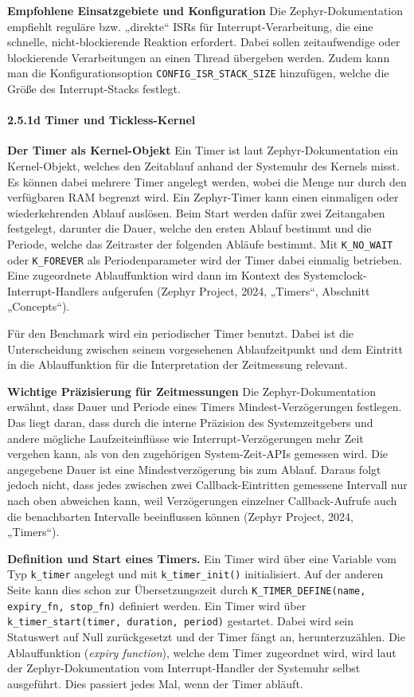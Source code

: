 \textbf{Empfohlene Einsatzgebiete und Konfiguration }Die Zephyr-Dokumentation empfiehlt reguläre bzw. „direkte“ ISRs für Interrupt-Verarbeitung, die eine schnelle, nicht-blockierende Reaktion erfordert. Dabei sollen zeitaufwendige oder blockierende Verarbeitungen an einen Thread übergeben werden. Zudem kann man die Konfigurationsoption \lstinline[style=fileinline]|CONFIG_ISR_STACK_SIZE| hinzufügen, welche die Größe des Interrupt-Stacks festlegt.

\paragraph*{\textbf{2.5.1d Timer und Tickless-Kernel}}
\textbf{Der Timer als Kernel-Objekt }Ein Timer ist laut Zephyr-Dokumentation ein Kernel-Objekt, welches den Zeitablauf anhand der Systemuhr des Kernels misst. Es können dabei mehrere Timer angelegt werden, wobei die Menge nur durch den verfügbaren RAM begrenzt wird. Ein Zephyr-Timer kann einen einmaligen oder wiederkehrenden Ablauf auslösen. Beim Start werden dafür zwei Zeitangaben festgelegt, darunter die Dauer, welche den ersten Ablauf bestimmt und die Periode, welche das Zeitraster der folgenden Abläufe bestimmt. Mit \lstinline[style=fileinline]|K_NO_WAIT| oder \lstinline[style=fileinline]|K_FOREVER| als Periodenparameter wird der Timer dabei einmalig betrieben. Eine zugeordnete Ablauffunktion wird dann im Kontext des Systemclock-Interrupt-Handlers aufgerufen (Zephyr Project, 2024, „Timers“, Abschnitt „Concepts“).

Für den Benchmark wird ein periodischer Timer benutzt. Dabei ist die Unterscheidung zwischen seinem vorgesehenen Ablaufzeitpunkt und dem Eintritt in die Ablauffunktion für die Interpretation der Zeitmessung relevant.

\textbf{Wichtige Präzisierung für Zeitmessungen }Die Zephyr-Dokumentation erwähnt, dass Dauer und Periode eines Timers Mindest-Verzögerungen festlegen. Das liegt daran, dass durch die interne Präzision des Systemzeitgebers und andere mögliche Laufzeiteinflüsse wie Interrupt-Verzögerungen mehr Zeit vergehen kann, als von den zugehörigen System-Zeit-APIs gemessen wird. Die angegebene Dauer ist eine Mindestverzögerung bis zum Ablauf. Daraus folgt jedoch nicht, dass jedes zwischen zwei Callback-Eintritten gemessene Intervall nur nach oben abweichen kann, weil Verzögerungen einzelner Callback-Aufrufe auch die benachbarten Intervalle beeinflussen können (Zephyr Project, 2024, „Timers“).

\textbf{Definition und Start eines Timers.} Ein Timer wird über eine Variable vom Typ \lstinline[style=fileinline]|k_timer| angelegt und mit \lstinline[style=fileinline]|k_timer_init()| initialisiert. Auf der anderen Seite kann dies schon zur Übersetzungszeit durch \lstinline[style=fileinline]|K_TIMER_DEFINE(name, expiry_fn, stop_fn)| definiert werden. Ein Timer wird über \lstinline[style=fileinline]|k_timer_start(timer, duration, period)| gestartet. Dabei wird sein Statuswert auf Null zurückgesetzt und der Timer fängt an, herunterzuzählen. Die Ablauffunktion (\emph{expiry function}), welche dem Timer zugeordnet wird, wird laut der Zephyr-Dokumentation vom Interrupt-Handler der Systemuhr selbst ausgeführt. Dies passiert jedes Mal, wenn der Timer abläuft.

